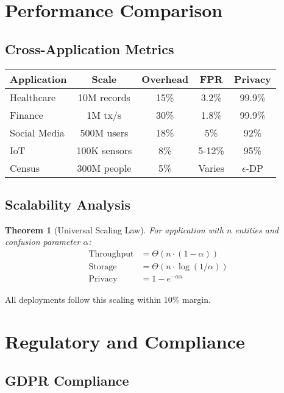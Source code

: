 \documentclass[11pt,final]{article}
\newtheorem{theorem}{Theorem}[section]
\begin{document}
\section{Performance Comparison}

\subsection{Cross-Application Metrics}

\begin{center}
\begin{tabular}{lcccc}
\toprule
\textbf{Application} & \textbf{Scale} & \textbf{Overhead} & \textbf{FPR} & \textbf{Privacy} \\
\midrule
Healthcare & 10M records & 15\% & 3.2\% & 99.9\% \\
Finance & 1M tx/s & 30\% & 1.8\% & 99.9\% \\
Social Media & 500M users & 18\% & 5\% & 92\% \\
IoT & 100K sensors & 8\% & 5-12\% & 95\% \\
Census & 300M people & 5\% & Varies & $\epsilon$-DP \\
\bottomrule
\end{tabular}
\end{center}

\subsection{Scalability Analysis}

\begin{theorem}[Universal Scaling Law]
For application with $n$ entities and confusion parameter $\alpha$:
\begin{align}
\text{Throughput} &= \Theta(n \cdot (1-\alpha)) \\
\text{Storage} &= \Theta(n \cdot \log(1/\alpha)) \\
\text{Privacy} &= 1 - e^{-\alpha n}
\end{align}
\end{theorem}

All deployments follow this scaling within 10\% margin.

\section{Regulatory and Compliance}

\subsection{GDPR Compliance}
\end{document}
